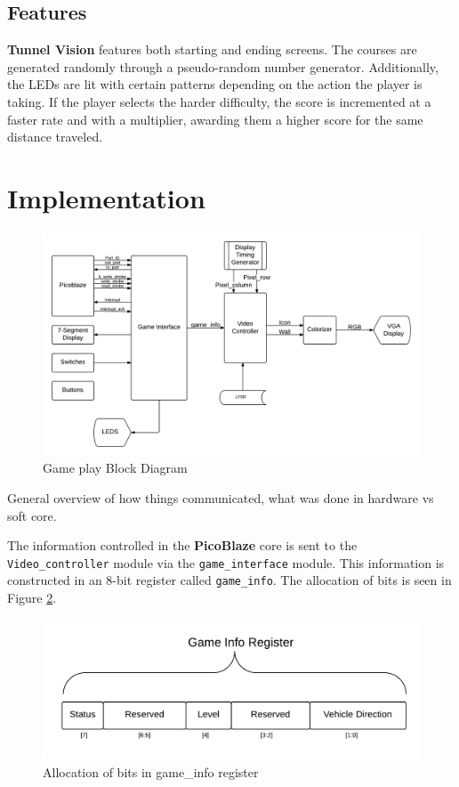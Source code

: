 \documentclass[11pt]{article}
\begin{document}
\subsection{Features}
\textbf{Tunnel Vision} features both starting and ending screens. The courses are generated randomly through a pseudo-random number generator. Additionally, the LEDs are lit with certain patterns depending on the action the player is taking. If the player selects the harder difficulty, the score is incremented at a faster rate and with a multiplier, awarding them a higher score for the same distance traveled.
	

\section{Implementation}

	\begin{figure}[h]\centering
	\includegraphics[height=0.7\textwidth, width=0.7\textheight]{Images/gameplay_diagram.png}
	\caption{Game play Block Diagram}
		\label{block_diagram}
	\end{figure}	

General overview of how things communicated, what was done in hardware vs soft core. 
		
The information controlled in the \textbf{PicoBlaze} core is sent to the \texttt{Video\_controller} module via the \texttt{game\_interface} module.  This information is constructed in an 8-bit register called \texttt{game\_info}.  The allocation of bits is seen in Figure \ref{game_info_bits}.

					
		\begin{figure}[h]\centering
		  \includegraphics[width=.8\textwidth]{Images/game_info_bits.png}
		  \caption{Allocation of bits in game\_info register}
		  \label{game_info_bits}
		\end{figure}		
		
\end{document}

